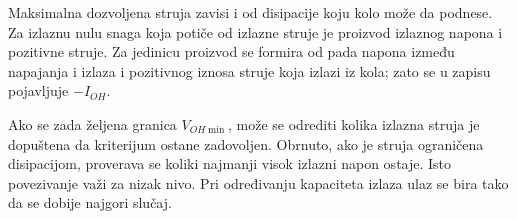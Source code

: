 Maksimalna dozvoljena struja zavisi i od disipacije koju kolo može da podnese. Za izlaznu nulu snaga koja potiče od izlazne struje je proizvod izlaznog napona i pozitivne struje. Za jedinicu proizvod se formira od pada napona između napajanja i izlaza i pozitivnog iznosa struje koja izlazi iz kola; zato se u zapisu pojavljuje $-I_{OH}$.

Ako se zada željena granica $V_{OH\min}$, može se odrediti kolika izlazna struja je dopuštena da kriterijum ostane zadovoljen. Obrnuto, ako je struja ograničena disipacijom, proverava se koliki najmanji visok izlazni napon ostaje. Isto povezivanje važi za nizak nivo. Pri određivanju kapaciteta izlaza ulaz se bira tako da se dobije najgori slučaj.
